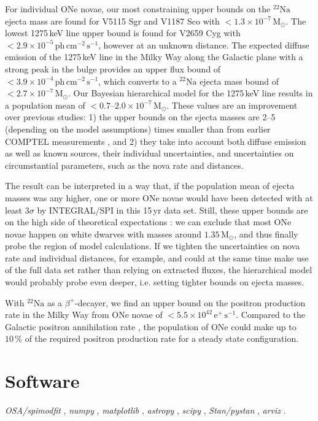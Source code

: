 \documentclass{aa}
\newcommand{\mrm}[1]{\mathrm{#1}}
\newcommand{\nuc}[2]{$\mrm{^{#2}#1}$}
\begin{document}
For individual ONe novae, our most constraining upper bounds on the \nuc{Na}{22} ejecta mass are found for V5115 Sgr and V1187 Sco with $<1.3 \times 10^{-7}\,\mrm{M_{\odot}}$.
%
The lowest 1275\,keV line upper bound is found for V2659 Cyg with $<2.9 \times 10^{-5}\,\mrm{ph\,cm^{-2}\,s^{-1}}$, however at an unknown distance.
%
The expected diffuse emission of the 1275\,keV line in the Milky Way along the Galactic plane with a strong peak in the bulge provides an upper flux bound of $<3.9 \times 10^{-4}\,\mrm{ph\,cm^{-2}\,s^{-1}}$, which converts to a \nuc{Na}{22} ejecta mass bound of $<2.7 \times 10^{-7}\,\mrm{M_{\odot}}$.
%
Our Bayesian hierarchical model for the 1275\,keV line results in a population mean of $<0.7$--$2.0 \times 10^{-7}\,\mrm{M_{\odot}}$.
%
These values are an improvement over previous studies:
%
1) the upper bounds on the ejecta masses are 2--5 (depending on the model assumptions) times smaller than from earlier COMPTEL measurements \citep{Jean2001_ONenovae1275}, and 2) they take into account both diffuse emission as well as known sources, their individual uncertainties, and uncertainties on circumstantial parameters, such as the nova rate and distances.

The result can be interpreted in a way that, if the population mean of ejecta masses was any higher, one or more ONe novae would have been detected with at least $3\sigma$ by INTEGRAL/SPI in this 15\,yr data set.
%
Still, these upper bounds are on the high side of theoretical expectations \citep[e.g.,][]{abcdefgh}:
%
we can exclude that most ONe novae happen on white dwarves with masses around $1.35\,\mrm{M_{\odot}}$, and thus finally probe the region of model calculations.
%
If we tighten the uncertainties on nova rate and individual distances, for example, and could at the same time make use of the full data set rather than relying on extracted fluxes, the hierarchical model would probably probe even deeper, i.e. setting tighter bounds on ejecta masses.

With \nuc{Na}{22} as a $\beta^+$-decayer, we find an upper bound on the positron production rate in the Milky Way from ONe novae of $< 5.5 \times 10^{42}\,\mrm{e^+\,s^{-1}}$.
%
Compared to the Galactic positron annihilation rate \citep{Siegert2016_511}, the population of ONe could make up to $10\,\%$ of the required positron production rate for a steady state configuration.



\section*{Software}
	\textit{OSA/spimodfit} \citep{spimodfit},
	\textit{numpy} \citep{Oliphant2006_numpy},
	\textit{matplotlib} \citep{Hunter2007_matplotlib},
	\textit{astropy} \citep{astropy2013_astropy},
	\textit{scipy} \citep{Virtanen2019_scipy},
	\textit{Stan/pystan} \citep{Carpenter2017_stan},
	\textit{arviz} \citep{Kumar2019_arviz}.
	
\end{document}
